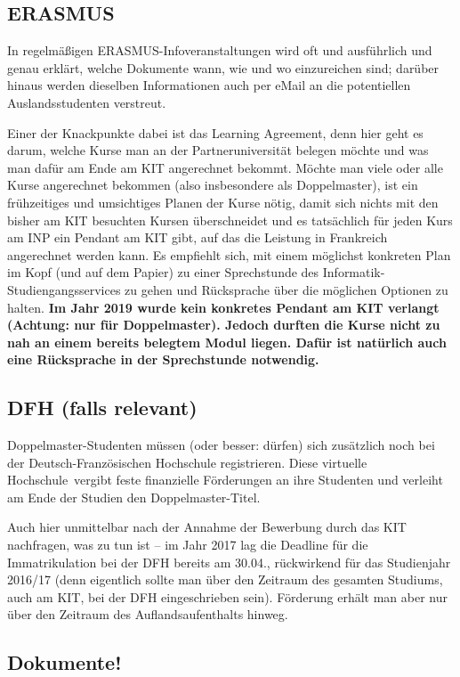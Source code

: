 \documentclass[11pt,a4paper]{article}
\newcommand{\change}[1]{{\bf #1}}
\begin{document}
	\subsection{ERASMUS}
	
	In regelmäßigen ERASMUS-Infoveranstaltungen wird oft und ausführlich und genau erklärt, welche Dokumente wann, wie und wo einzureichen sind; darüber hinaus werden dieselben Informationen auch per eMail an die potentiellen Auslandsstudenten verstreut. 
	
  Einer der Knackpunkte dabei ist das Learning Agreement, denn hier geht es darum, welche Kurse man an der Partneruniversität belegen möchte und was man dafür am Ende am KIT angerechnet bekommt. Möchte man viele oder alle Kurse angerechnet bekommen (also insbesondere als Doppelmaster), ist ein frühzeitiges und umsichtiges Planen der Kurse nötig, damit sich nichts mit den bisher am KIT besuchten Kursen überschneidet und es tatsächlich für jeden Kurs am INP ein Pendant am KIT gibt, auf das die Leistung in Frankreich angerechnet werden kann. Es empfiehlt sich, mit einem möglichst konkreten Plan im Kopf (und auf dem Papier) zu einer Sprechstunde des Informatik-Studiengangsservices zu gehen und Rücksprache über die möglichen Optionen zu halten. \change{Im Jahr 2019 wurde kein konkretes Pendant am KIT verlangt (Achtung: nur für Doppelmaster). Jedoch durften die Kurse nicht zu nah an einem bereits belegtem Modul liegen. Dafür ist natürlich auch eine Rücksprache in der Sprechstunde notwendig.}
	
	\subsection{DFH (falls relevant)}
	
	Doppelmaster-Studenten müssen (oder besser: dürfen) sich zusätzlich noch bei der Deutsch-Französischen Hochschule registrieren. Diese \glqq virtuelle Hochschule\grqq\ vergibt feste finanzielle Förderungen an ihre Studenten und verleiht am Ende der Studien den Doppelmaster-Titel. 
	
	Auch hier unmittelbar nach der Annahme der Bewerbung durch das KIT nachfragen, was zu tun ist -- im Jahr 2017 lag die Deadline für die Immatrikulation bei der DFH bereits am 30.04., rückwirkend für das Studienjahr 2016/17 (denn eigentlich sollte man über den Zeitraum des gesamten Studiums, auch am KIT, bei der DFH eingeschrieben sein). Förderung erhält man aber nur über den Zeitraum des Auflandsaufenthalts hinweg.
	
	\subsection{Dokumente!}
		
\end{document}
